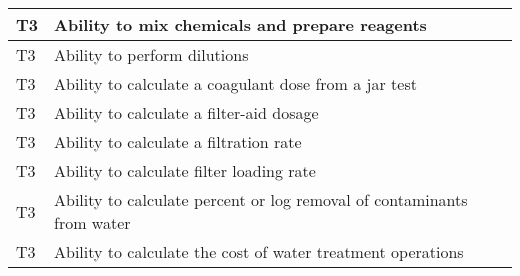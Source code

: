 \begin{table}[H]
\begin{tabular}{| m{1cm} |m{15cm} |}
T3 & Ability to mix   chemicals and prepare reagents                              \\ \hline
T3 & Ability to perform   dilutions                                               \\ \hline
T3 & Ability to calculate   a coagulant dose from a jar test                      \\ \hline
T3 & Ability to calculate   a filter-aid dosage                                   \\ \hline
T3 & Ability to calculate   a filtration rate                                     \\ \hline
T3 & Ability to calculate   filter loading rate                                   \\ \hline
T3 & Ability to calculate   percent or log removal of contaminants from water     \\ \hline
T3 & Ability to calculate   the cost of water treatment operations                \\ \hline
\end{tabular}
\end{table}
\newpage










